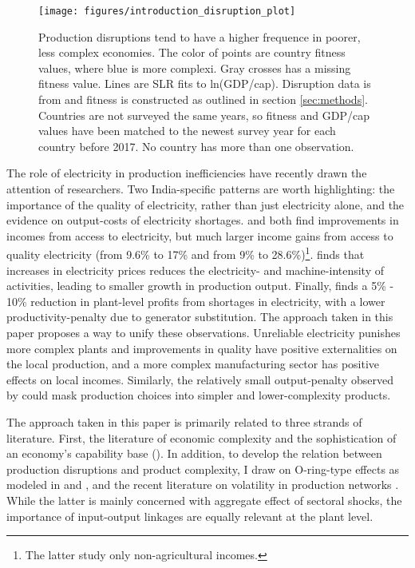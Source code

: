 \documentclass[11pt]{article}
\begin{document}
\begin{figure}[htpb]
	\centering
	\texttt{[image: figures/introduction\_disruption\_plot]}
	\caption{Production disruptions tend to have a higher frequence in poorer, less complex economies. The color of points are country fitness values, where blue is more complexi. Gray crosses has a missing fitness value. Lines are SLR fits to ln(GDP/cap). Disruption data is from \cite{world_bank_enterprise_2020} and fitness is constructed as outlined in section \ref{sec:methods}. Countries are not surveyed the same years, so fitness and GDP/cap values have been matched to the newest survey year for each country before 2017. No country has more than one observation.}
	\label{fig:disruption-fig}
\end{figure}

The role of electricity in production inefficiencies have recently drawn the attention of researchers. Two India-specific patterns are worth highlighting: the importance of the quality of electricity, rather than just electricity alone, and the evidence on output-costs of electricity shortages. \cite{samad_benefits_2016} and \cite{chakravorty_does_2014} both find improvements in incomes from access to electricity, but much larger income gains from access to quality electricity (from 9.6\% to 17\% and from 9\% to 28.6\%)\footnote{The latter study only non-agricultural incomes.}. \cite{abeberese_electricity_2017} finds that increases in electricity prices reduces the electricity- and machine-intensity of activities, leading to smaller growth in production output. Finally, \cite{allcott_how_2016} finds a 5\% - 10\% reduction in plant-level profits from shortages in electricity, with a lower productivity-penalty due to generator substitution. The approach taken in this paper proposes a way to unify these observations. Unreliable electricity punishes more complex plants and improvements in quality have positive externalities on the local production, and a more complex manufacturing sector has positive effects on local incomes. Similarly, the relatively small output-penalty observed by \cite{allcott_how_2016} could mask production choices into simpler and lower-complexity products.

The approach taken in this paper is primarily related to three strands of literature. First, the literature of economic complexity and the sophistication of an economy's capability base  (\citealp{frenken_related_2007,hausmann_atlas_2013,tacchella_new_2012}). In addition, to develop the relation between production disruptions and product complexity, I draw on O-ring-type effects as modeled in \cite{kremer_o-ring_1993} and \cite{jones_intermediate_2011}, and the recent literature on volatility in production networks \citep{acemoglu_network_2012}. While the latter is mainly concerned with aggregate effect of sectoral shocks, the importance of input-output linkages are equally relevant at the plant level.
\end{document}
